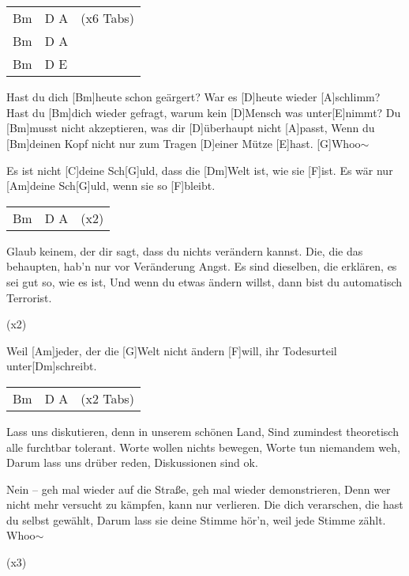 
\\ \\



\begin{guitar}
	{\footnotesize\begin{tabular}{l|ll}
			Bm & D A & (x6 Tabs) \\
			Bm & D A & \\
			Bm & D E & 
	\end{tabular}}
	
	Hast du dich [Bm]heute schon geärgert? War es [D]heute wieder [A]schlimm?
	Hast du [Bm]dich wieder gefragt, warum kein [D]Mensch was unter[E]nimmt?
	Du [Bm]musst nicht akzeptieren, was dir [D]{ü}berhaupt nicht [A]passt,
	Wenn du [Bm]deinen Kopf nicht nur zum Tragen [D]einer Mütze [E]hast. [G]Whoo$\sim$
	
	Es ist nicht [C]deine Sch[G]uld, dass die [Dm]Welt ist, wie sie [F]ist.
	Es wär nur [Am]deine Sch[G]uld, wenn sie so [F]bleibt.
	
	{\footnotesize\begin{tabular}{l|ll}
			Bm & D A & (x2)
	\end{tabular}}
	
	Glaub keinem, der dir sagt, dass du nichts verändern kannst.
	Die, die das behaupten, hab'n nur vor Veränderung Angst.
	Es sind dieselben, die erklären, es sei gut so, wie es ist,
	Und wenn du etwas ändern willst, dann bist du automatisch Terrorist.
	
	  (x2)

	Weil [Am]jeder, der die [G]Welt nicht ändern [F]will, ihr Todesurteil unter[Dm]schreibt.
	
	{\footnotesize\begin{tabular}{l|ll}
			Bm & D A & (x2 Tabs)
	\end{tabular}}

	\pagebreak
	
	Lass uns diskutieren, denn in unserem schönen Land,
	Sind zumindest theoretisch alle furchtbar tolerant.
	Worte wollen nichts bewegen, Worte tun niemandem weh,
	Darum lass uns drüber reden, Diskussionen sind ok.
	
	Nein – geh mal wieder auf die Straße, geh mal wieder demonstrieren,
	Denn wer nicht mehr versucht zu kämpfen, kann nur verlieren.
	Die dich verarschen, die hast du selbst gewählt,
	Darum lass sie deine Stimme hör'n, weil jede Stimme zählt. Whoo$\sim$
	
	  (x3)
\end{guitar}
